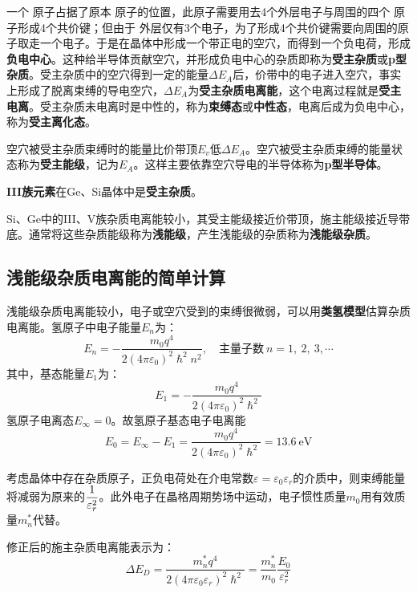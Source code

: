 一个 原子占据了原本 原子的位置，此原子需要用去4个外层电子与周围的四个 原子形成4个共价键；但由于 外层仅有3个电子，为了形成4个共价键需要向周围的原子取走一个电子。于是在晶体中形成一个带正电的空穴，而得到一个负电荷，形成\textbf{负电中心}。这种给半导体贡献空穴，并形成负电中心的杂质即称为\textbf{受主杂质}或\textbf{p型杂质}。受主杂质中的空穴得到一定的能量$\Delta E_A$后，价带中的电子进入空穴，事实上形成了脱离束缚的导电空穴，$\Delta E_A$为\textbf{受主杂质电离能}，这个电离过程就是\textbf{受主电离}。受主杂质未电离时是中性的，称为\textbf{束缚态}或\textbf{中性态}，电离后成为负电中心，称为\textbf{受主离化态}。

空穴被受主杂质束缚时的能量比价带顶$E_v$低$\Delta E_A$。空穴被受主杂质束缚的能量状态称为\textbf{受主能级}，记为$E_A$。这样主要依靠空穴导电的半导体称为\textbf{p型半导体}。

\textbf{III族元素}在Ge、Si晶体中是\textbf{受主杂质}。

Si、Ge中的III、V族杂质电离能较小，其受主能级接近价带顶，施主能级接近导带底。通常将这些杂质能级称为\textbf{浅能级}，产生浅能级的杂质称为\textbf{浅能级杂质}。

\subsection{浅能级杂质电离能的简单计算}

浅能级杂质电离能较小，电子或空穴受到的束缚很微弱，可以用\textbf{类氢模型}估算杂质电离能。氢原子中电子能量$E_n$为：
\begin{equation}
    E_n=-\frac{m_0q^4}{2(4\pi\varepsilon_0)^2\hslash^2n^2},\quad \text{主量子数}\ n=1,\ 2,\ 3,\cdots
\end{equation}
其中，基态能量$E_1$为：
\begin{equation}
    E_1=-\frac{m_0q^4}{2(4\pi\varepsilon_0)^2\hslash^2}
\end{equation}
氢原子电离态$E_\infty=0$。故氢原子基态电子电离能
\begin{equation}
    E_0=E_\infty-E_1=\frac{m_0q^4}{2(4\pi\varepsilon_0)^2\hslash^2}=13.6\ \mathrm{eV}
\end{equation}

考虑晶体中存在杂质原子，正负电荷处在介电常数\vspace{1ex}$\varepsilon=\varepsilon_0\varepsilon_r$的介质中，则束缚能量将减弱为原来的$\displaystyle\frac{1}{\varepsilon_r^2}$。此外电子在晶格周期势场中运动，电子惯性质量$m_0$用有效质量$m_n^*$代替。

修正后的施主杂质电离能表示为：
\begin{equation}
    \Delta E_D=\frac{m_n^*q^4}{2(4\pi\varepsilon_0\varepsilon_r)^2\hslash^2}=\frac{m_n^*}{m_0}\frac{E_0}{\varepsilon_r^2}
\end{equation}

